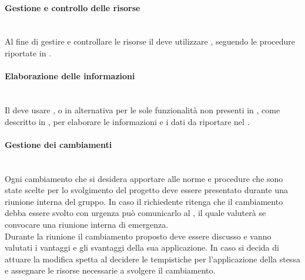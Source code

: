\paragraph{Gestione e controllo delle risorse}\mbox{}\\
Al fine di gestire e controllare le risorse il \Responsabile{} deve utilizzare , seguendo le procedure riportate in .

\paragraph{Elaborazione delle informazioni}\mbox{}\\
Il \Responsabile{} deve usare , o in alternativa  per le sole funzionalità non presenti in , come descritto in , per elaborare le informazioni e i dati da riportare nel \PianoDiProgetto.

\paragraph{Gestione dei cambiamenti}\mbox{}\\
Ogni cambiamento che si desidera apportare alle norme e procedure che sono state scelte per lo svolgimento del progetto deve essere presentato durante una riunione interna del gruppo. In caso il richiedente ritenga che il cambiamento debba essere svolto con urgenza può comunicarlo al \Responsabile{}, il quale valuterà se convocare una riunione interna di emergenza.
\\Durante la riunione il cambiamento proposto deve essere discusso e vanno valutati i vantaggi e gli svantaggi della sua applicazione. In caso si decida di attuare la modifica spetta al \Responsabile{} decidere le tempistiche per l'applicazione della stessa e assegnare le risorse necessarie a svolgere il cambiamento.

